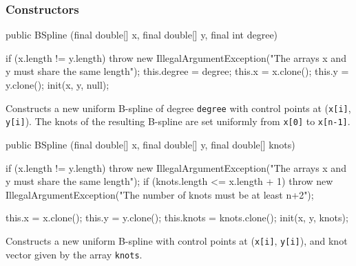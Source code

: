 \subsubsection* {Constructors}
\begin{code}

   public BSpline (final double[] x, final double[] y, final int degree)\begin{hide} {
      if (x.length != y.length)
         throw new IllegalArgumentException("The arrays x and y must share the same length");
      this.degree = degree;
      this.x = x.clone();
      this.y = y.clone();
      init(x, y, null);
   }\end{hide}
\end{code}
\begin{tabb}
   Constructs a new uniform B-spline of degree \texttt{degree}
   with control points at (\texttt{x[i]}, \texttt{y[i]}).
   The knots of the resulting B-spline are set uniformly from
    \texttt{x[0]} to \texttt{x[n-1]}.
\end{tabb}
\begin{htmlonly}
\end{htmlonly}
\begin{code}

   public BSpline (final double[] x, final double[] y, final double[] knots)\begin{hide} {
      if (x.length != y.length)
         throw new IllegalArgumentException("The arrays x and y must share the same length");
      if (knots.length <= x.length + 1)
         throw new IllegalArgumentException("The number of knots must be at least n+2");

      this.x = x.clone();
      this.y = y.clone();
      this.knots = knots.clone();
      init(x, y, knots);
   }\end{hide}
\end{code}
\begin{tabb}
   Constructs a new uniform B-spline
   with control points at (\texttt{x[i]}, \texttt{y[i]}), and
   knot vector given by the array \texttt{knots}.
\end{tabb}
\begin{htmlonly}
\end{htmlonly}

